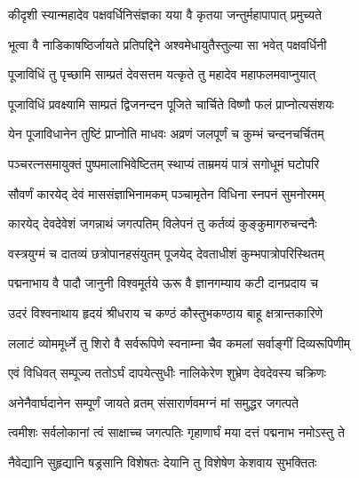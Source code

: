 \twolineshloka
{कीदृशी स्यान्महादेव पक्षवर्धिनिसंज्ञका}
{यया वै कृतया जन्तुर्महापापात् प्रमुच्यते}%



\twolineshloka
{भूत्वा वै नाडिकाषष्ठिर्जायते प्रतिपद्दिने}
{अश्वमेधायुतैस्तुल्या सा भवेत् पक्षवर्धिनी}%


\twolineshloka
{पूजाविधिं तु पृच्छामि साम्प्रतं देवसत्तम}
{यत्कृते तु महादेव महाफलमवाप्नुयात्}%


\twolineshloka
{पूजाविधिं प्रवक्ष्यामि साम्प्रतं द्विजनन्दन}
{पूजिते चार्चिते विष्णौ फलं प्राप्नोत्यसंशयः}%

\twolineshloka
{येन पूजाविधानेन तुष्टिं प्राप्नोति माधवः}
{अव्रणं जलपूर्णं च कुम्भं चन्दनचर्चितम्}%

\twolineshloka
{पञ्चरत्नसमायुक्तं पुष्पमालाभिवेष्टितम्}
{स्थाप्यं ताम्रमयं पात्रं सगोधूमं घटोपरि}%

\twolineshloka
{सौवर्णं कारयेद् देवं माससंज्ञाभिनामकम्}
{पञ्चामृतेन विधिना स्नपनं सुमनोरमम्}%

\twolineshloka
{कारयेद् देवदेवेशं जगन्नाथं जगत्पतिम्}
{विलेपनं तु कर्तव्यं कुङ्कुमागरुचन्दनैः}%

\twolineshloka
{वस्त्रयुग्मं च दातव्यं छत्रोपानहसंयुतम्}
{पूजयेद् देवताधीशं कुम्भपात्रोपरिस्थितम्}%

\twolineshloka
{पद्मनाभाय वै पादौ जानुनी विश्वमूर्तये}
{ऊरू वै ज्ञानगम्याय कटी दानप्रदाय च}%

\twolineshloka
{उदरं विश्वनाथाय हृदयं श्रीधराय च}
{कण्ठं कौस्तुभकण्ठाय बाहू क्षत्रान्तकारिणे}%

\twolineshloka
{ललाटं व्योममूर्ध्ने तु शिरो वै सर्वरूपिणे}
{स्वनाम्ना चैव कमलां सर्वाङ्गीं दिव्यरूपिणीम्}%

\twolineshloka
{एवं विधिवत् सम्पूज्य ततोऽर्घं दापयेत्सुधीः}
{नालिकेरेण शुभ्रेण देवदेवस्य चक्रिणः}%

\twolineshloka
{अनेनैवार्घदानेन सम्पूर्णं जायते व्रतम्}
{संसारार्णवमग्नं मां समुद्धर जगत्पते}%

\twolineshloka
{त्वमीशः सर्वलोकानां त्वं साक्षाच्च जगत्पतिः}
{गृहाणार्घं मया दत्तं पद्मनाभ नमोऽस्तु ते}%

\twolineshloka
{नैवेद्यानि सुहृद्यानि षड्रसानि विशेषतः}
{देयानि तु विशेषेण केशवाय सुभक्तितः}%


